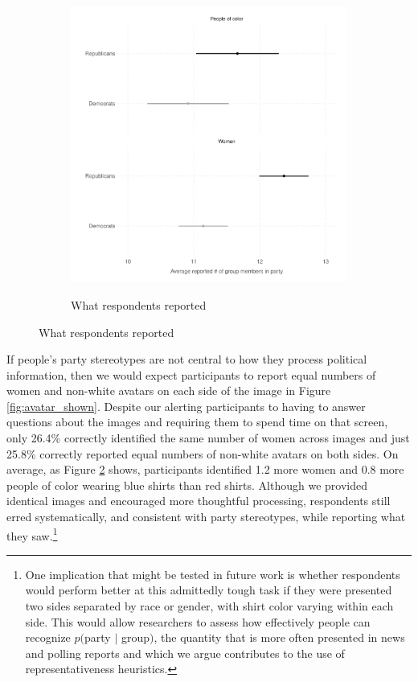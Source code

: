 \documentclass[12pt, letterpaper]{article}
\begin{document}
\begin{figure}
\ContinuedFloat
\begin{subfigure}[t]{1\textwidth}
	\caption{What respondents reported}
	\includegraphics[width=1\textwidth]{../figs/fig_si_41_avatars.pdf} \label{fig:avatar_guessed}
\end{subfigure}
\end{figure}

If people's party stereotypes are not central to how they process political information, then we would expect participants to report equal numbers of women and non-white avatars on each side of the image in Figure \ref{fig:avatar_shown}. Despite our alerting participants to having to answer questions about the images and requiring them to spend time on that screen, only 26.4\% correctly identified the same number of women across images and just 25.8\% correctly reported equal numbers of non-white avatars on both sides. On average, as Figure \ref{fig:avatar_guessed} shows, participants identified 1.2 more women and 0.8 more people of color wearing blue shirts than red shirts. Although we provided identical images and encouraged more thoughtful processing, respondents still erred systematically, and consistent with party stereotypes, while reporting what they saw.\footnote{One implication that might be tested in future work is whether respondents would perform better at this admittedly tough task if they were presented two sides separated by race or gender, with shirt color varying within each side. This would allow researchers to assess how effectively people can recognize $p($party $|$ group$)$, the quantity that is more often presented in news and polling reports and which we argue contributes to the use of representativeness heuristics.}
\end{document}
